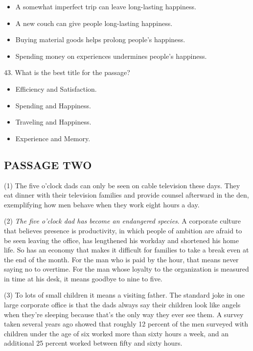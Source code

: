 \documentclass[UTF8,11pt]{ctexart}
\begin{document}
\begin{itemize}[leftmargin=2em,itemsep=.2em,topsep=.4em]\item[A.] A somewhat imperfect trip can leave long-lasting happiness.
\item[B.] A new couch can give people long-lasting happiness.
\item[C.] Buying material goods helps prolong people’s happiness.
\item[D.] Spending money on experiences undermines people’s happiness.
\end{itemize}

43. What is the best title for the passage?


\begin{itemize}[leftmargin=2em,itemsep=.2em,topsep=.4em]\item[A.] Efficiency and Satisfaction.
\item[B.] Spending and Happiness.
\item[C.] Traveling and Happiness.
\item[D.] Experience and Memory.
\end{itemize}

\subsection*{\textbf{PASSAGE TWO}}


(1) The five o’clock dads can only be seen on cable television these days. They eat dinner with their television families and provide counsel afterward in the den, exemplifying how men behave when they work eight hours a day.


(2) \textit{The five o’clock dad has become an endangered species}. A corporate culture that believes presence is productivity, in which people of ambition are afraid to be seen leaving the office, has lengthened his workday and shortened his home life. So has an economy that makes it difficult for families to take a break even at the end of the month. For the man who is paid by the hour, that means never saying no to overtime. For the man whose loyalty to the organization is measured in time at his desk, it means goodbye to nine to five.


(3) To lots of small children it means a visiting father. The standard joke in one large corporate office is that the dads always say their children look like angels when they’re sleeping because that’s the only way they ever see them. A survey taken several years ago showed that roughly 12 percent of the men surveyed with children under the age of six worked more than sixty hours a week, and an additional 25 percent worked between fifty and sixty hours.
\end{document}
